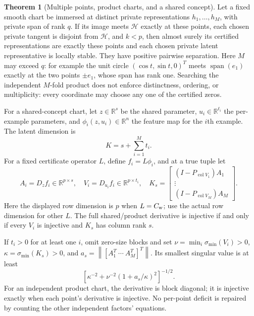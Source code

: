 \documentclass[11pt,a4paper]{article}
\theoremstyle{definition}
\newtheorem{theorem}{Theorem}[section]
\theoremstyle{definition}
\theoremstyle{remark}\newtheorem{remark}[theorem]{Remark}
\newcommand{\R}{\mathbb R}\newcommand{\Prob}{\mathbb P}\newcommand{\E}{\mathbb E}
\newcommand{\HH}{\mathcal H}\newcommand{\XX}{\mathcal X}\newcommand{\col}{\operatorname{col}}
\newcommand{\smin}{\sigma_{\min}}\newcommand{\smax}{\sigma_{\max}}
\newcommand{\norm}[1]{\left\lVert #1\right\rVert}
\newcommand{\proj}[1]{P_{#1}}
\begin{document}
\begin{theorem}[Multiple points, product charts, and a shared concept]\label{thm:shared}
Let a fixed smooth chart be immersed at distinct private representations $h_1,\ldots,h_M$, with private span of rank $q$. If its image meets $\HH$ exactly at these points, each chosen private tangent is disjoint from $\HH$, and $k<p$, then almost surely its certified representations are exactly these points and each chosen private latent representative is locally stable. They have positive pairwise separation. Here $M$ may exceed $q$: for example the unit circle $(\cos t,\sin t,0)^T$ meets $\operatorname{span}(e_1)$ exactly at the two points $\pm e_1$, whose span has rank one. Searching the independent $M$-fold product does not enforce distinctness, ordering, or multiplicity: every coordinate may choose any one of the certified zeros.

For a shared-concept chart, let $z\in\R^s$ be the shared parameter, $u_i\in\R^{t_i}$ the per-example parameters, and $\phi_i(z,u_i)\in\R^n$ the feature map for the $i$th example. The latent dimension is
\[
K=s+\sum_{i=1}^M t_i.
\]
For a fixed certificate operator $L$, define $f_i=L\phi_i$, and at a true tuple let
\[
A_i=D_z f_i\in\R^{p\times s},\quad V_i=D_{u_i}f_i\in\R^{p\times t_i},\quad
K_s=\begin{bmatrix}(I-\proj{\col V_1})A_1\\ \vdots\\(I-\proj{\col V_M})A_M\end{bmatrix}.
\]
Here the displayed row dimension is $p$ when $L=C_{\rm w}$; use the actual row dimension for other $L$. The full shared/product derivative is injective if and only if every $V_i$ is injective and $K_s$ has column rank $s$.

If $t_i>0$ for at least one $i$, omit zero-size blocks and set $\nu=\min_i\smin(V_i)>0$, $\kappa=\smin(K_s)>0$, and $a_s=\norm{[A_1^T\ \cdots\ A_M^T]^T}$. Its smallest singular value is at least
\begin{equation}\label{eq:sharedcond}
\left[\kappa^{-2}+\nu^{-2}(1+a_s/\kappa)^2\right]^{-1/2}.
\end{equation}
For an independent product chart, the derivative is block diagonal; it is injective exactly when each point's derivative is injective. No per-point deficit is repaired by counting the other independent factors' equations.
\end{theorem}
\end{document}
